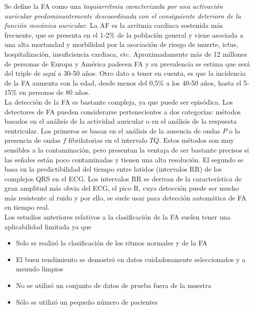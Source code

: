     Se define la FA como una \textit{taquiarritmia caracterizada por una activación auricular predominantemente descoordinada con el consiguiente deterioro de la función mecánica auricular}. La AF es la arritmia cardiaca sostenida más frecuente, que se presenta en el 1-2\% de la población general y viene asociada a una alta mortandad y morbilidad por la asociación de riesgo de muerte, ictus, hospitalización, insuficiencia cardiaca, etc. Aproximadamente más de 12 millones de personas de Europa y América padecen FA y su prevalencia se estima que será del triple de aquí a 30-50 años. Otro dato a tener en cuenta, es que la incidencia de la FA aumenta con la edad, desde menos del 0,5\% a los 40-50 años, hasta el 5-15\% en personas de 80 años. \\
    

    La detección de la FA es bastante compleja, ya que puede ser episódica. Los detectores de FA pueden considerarse pertenecientes a dos categorías: métodos basados en el análisis de la actividad auricular o en el análisis de la respuesta ventricular. Los primeros se basan en el análisis de la ausencia de ondas $P$ o la presencia de ondas $f$ fibrilatorias en el intervalo $TQ$. Estos métodos son muy sensibles a la contaminación, pero presentan la ventaja de ser bastante precisos si las señales están poco contaminadas y tienen una alta resolución. El segundo se basa en la predictibilidad del tiempo entre latidos (intervalos RR) de los complejos QRS en el ECG. Los intervalos RR se derivan de la característica de gran amplitud más obvia del ECG, el pico R, cuya detección puede ser mucho más resistente al ruido y por ello, se suele usar para detección automática de FA en tiempo real. \\

        Los estudios anteriores relativos a la clasificación de la FA suelen tener una aplicabilidad limitada ya que
        \begin{itemize}
            \item Solo se realizó la clasificación de los ritmos normales y de la FA
            \item El buen rendimiento se demostró en datos cuidadosamente seleccionados y a menudo limpios
            \item No se utilizó un conjunto de datos de prueba fuera de la muestra
            \item Sólo se utilizó un pequeño número de pacientes
        \end{itemize}

    
        

